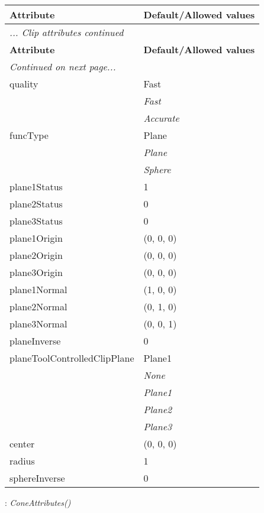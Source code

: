 \documentclass[10pt,a4paper]{report}
\begin{document}
\begin{longtable}{ll}
{\bf Attribute} & {\bf Default/Allowed values} \\
\hline \hline
\endfirsthead
\multicolumn{2}{l}{{\it ... Clip attributes continued}} \\
{\bf Attribute} & {\bf Default/Allowed values} \\
\hline \hline
\endhead
\hline
\multicolumn{2}{l}{{\it Continued on next page...}} \\
\endfoot
\hline
\endlastfoot

quality  &  Fast   \\
 & {\it  Fast} \\
 & {\it  Accurate} \\
funcType  &  Plane   \\
 & {\it  Plane} \\
 & {\it  Sphere} \\
plane1Status  &  1 \\
plane2Status  &  0 \\
plane3Status  &  0 \\
plane1Origin  &  (0, 0, 0) \\
plane2Origin  &  (0, 0, 0) \\
plane3Origin  &  (0, 0, 0) \\
plane1Normal  &  (1, 0, 0) \\
plane2Normal  &  (0, 1, 0) \\
plane3Normal  &  (0, 0, 1) \\
planeInverse  &  0 \\
planeToolControlledClipPlane  &  Plane1   \\
 & {\it  None} \\
 & {\it  Plane1} \\
 & {\it  Plane2} \\
 & {\it  Plane3} \\
center  &  (0, 0, 0) \\
radius  &  1 \\
sphereInverse  &  0 \\
\end{longtable}

\newpage

{}
: {\it ConeAttributes() }\\[-3mm]
\end{document}
